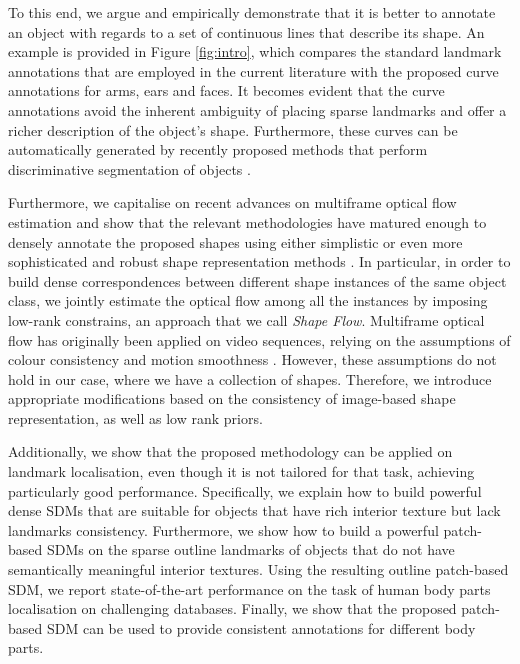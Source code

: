 To this end, we argue and empirically demonstrate that it is better to annotate an object with regards to a set of continuous lines that describe its shape. An example is provided in Figure \ref{fig:intro}, which compares the standard landmark annotations that are employed in the current literature with the proposed curve annotations for arms, ears and faces. It becomes evident that the curve annotations avoid the inherent ambiguity of placing sparse landmarks and offer a richer description of the object's shape.
%
Furthermore, these curves can be automatically generated by recently proposed methods that perform discriminative segmentation of objects \cite{luo2013pedestrian,liu2015matching}.

Furthermore, we capitalise on recent advances on multiframe optical flow estimation \cite{Garg:2013hu,tomasi2012dense,snape15faceflow} and show that the relevant methodologies have matured enough to densely annotate the proposed shapes using either simplistic or even more sophisticated and robust shape representation methods \cite{Nguyen2013}.
In particular, in order to build dense correspondences between different shape instances of the same object class, we jointly estimate the optical flow among all the instances by imposing low-rank constrains, an approach that we call \emph{Shape Flow}. Multiframe optical flow has originally been applied on video sequences, relying on the assumptions of colour consistency and motion smoothness \cite{Garg:2013hu}. However, these assumptions do not hold in our case, where we have a collection of shapes. Therefore, we introduce appropriate modifications based on the consistency of image-based shape representation, as well as low rank priors.
%

Additionally, we show that the proposed methodology can be applied on landmark localisation, even though it is not tailored for that task, achieving particularly good performance. Specifically, we explain how to build powerful dense SDMs that are suitable for objects that have rich interior texture but lack landmarks consistency. Furthermore, we show how to build a powerful patch-based SDMs on the sparse outline landmarks of objects that do not have semantically meaningful interior textures. Using the resulting outline patch-based SDM, we report state-of-the-art performance on the task of human body parts localisation on challenging databases. Finally, we show that the proposed patch-based SDM can be used to provide consistent annotations for different body parts.


